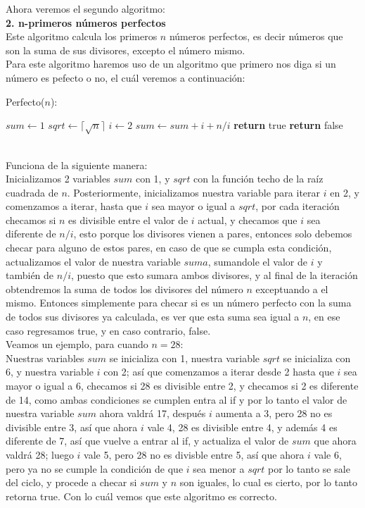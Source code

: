 \documentclass[12pt,twoside]{article}
\begin{document}
\newpage
Ahora veremos el segundo algoritmo:
\\ \textbf{2. n-primeros números perfectos}
\\ Este algoritmo calcula los primeros $n$ números perfectos, es decir números que son la suma de sus divisores, excepto el número mismo.
\\ Para este algoritmo haremos uso de un algoritmo que primero nos diga si un número es pefecto o no, el cuál veremos a continuación:
\begin{algorithm}
    \caption{Perfecto($n$):}
    \begin{algorithmic}
        \State $sum \gets 1$
        \State $sqrt \gets \lceil \sqrt{n} \rceil$
        \State $i \gets 2$
                \State $sum \gets sum+i+n/i$
            \EndIf
        \EndFor
            \State \textbf{return} true
        \Else
            \State \textbf{return} false
        \EndIf
    \end{algorithmic}
\end{algorithm}
\\ Funciona de la siguiente manera:
\\ Inicializamos 2 variables $sum$ con 1, y $sqrt$ con la función techo de la raíz cuadrada de $n$. Posteriormente, inicializamos nuestra variable para iterar $i$ en 2, y comenzamos a iterar, hasta que $i$ sea mayor o igual a $sqrt$, por cada iteración checamos si $n$ es divisible entre el valor de $i$ actual, y checamos que $i$ sea diferente de $n/i$, esto porque los divisores vienen a pares, entonces solo debemos checar para alguno de estos pares, en caso de que se cumpla esta condición, actualizamos el valor de nuestra variable $suma$, sumandole el valor de $i$ y también de $n/i$, puesto que esto sumara ambos divisores, y al final de la iteración obtendremos la suma de todos los divisores del número $n$ exceptuando a el mismo. Entonces simplemente para checar si es un número perfecto con la suma de todos sus divisores ya calculada, es ver que esta suma sea igual a $n$, en ese caso regresamos true, y en caso contrario, false.
\newline
\\ Veamos un ejemplo, para cuando $n=28$:
\\ Nuestras variables $sum$ se inicializa con 1, nuestra variable $sqrt$ se inicializa con 6, y nuestra variable $i$ con 2; así que comenzamos a iterar desde 2 hasta que $i$ sea mayor o igual a 6, checamos si 28 es divisible entre 2, y checamos si 2 es diferente de 14, como ambas condiciones se cumplen entra al if y por lo tanto el valor de nuestra variable $sum$ ahora valdrá 17, después $i$ aumenta a 3, pero 28 no es divisible entre 3, así que ahora $i$ vale 4, 28 es divisible entre 4, y además 4 es diferente de 7, así que vuelve a entrar al if, y actualiza el valor de $sum$ que ahora valdrá 28; luego $i$ vale 5, pero 28 no es divisble entre 5, así que ahora $i$ vale 6, pero ya no se cumple la condición de que $i$ sea menor a $sqrt$ por lo tanto se sale del ciclo, y procede a checar si $sum$ y $n$ son iguales, lo cual es cierto, por lo tanto retorna true. Con lo cuál vemos que este algoritmo es correcto.
\end{document}
